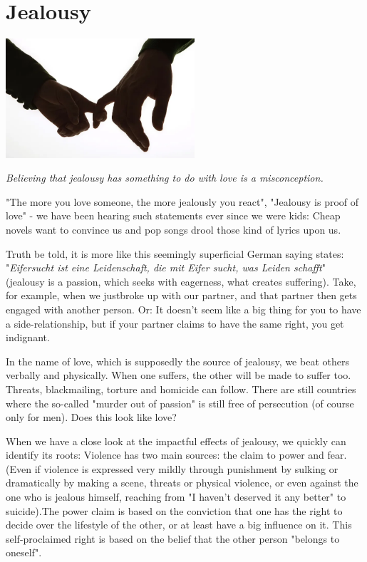\section{Jealousy}

\begin{center}
\includegraphics[width=7cm]{images/12_jealousy.png}
\end{center}

\textit{Believing that jealousy has something to do with love is a misconception.}

"The more you love someone, the more jealously you react", "Jealousy is proof of love" - we have been hearing such statements ever since we were kids: Cheap novels want to convince us and pop songs drool those kind of lyrics upon us.

Truth be told, it is more like this seemingly superficial German saying states: "\textit{Eifersucht ist eine Leidenschaft, die mit Eifer sucht, was Leiden schafft}" (jealousy is a passion, which seeks with eagerness, what creates suffering). Take, for example, when we justbroke up with our partner, and that partner then gets engaged with another person. Or: It doesn't seem like a big thing for you to have a side-relationship, but if your partner claims to have the same right, you get indignant.

In the name of love, which is supposedly the source of jealousy, we beat others verbally and physically. When one suffers, the other will be made to suffer too. Threats, blackmailing, torture and homicide can follow. There are still countries where the so-called "murder out of passion" is still free of persecution (of course only for men). Does this look like love?

When we have a close look at the impactful effects of jealousy, we quickly can identify its roots: Violence has two main sources: the claim to power and fear. (Even if violence is expressed very mildly through punishment by sulking or dramatically by making a scene, threats or physical violence, or even against the one who is jealous himself, reaching from "I haven't deserved it any better" to suicide).The power claim is based on the conviction that one has the right to decide over the lifestyle of the other, or at least have a big influence on it. This self-proclaimed right is based on the belief that the other person "belongs to oneself".

